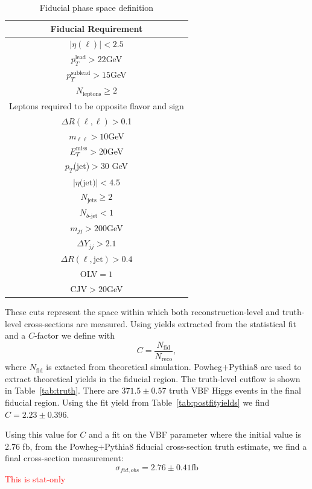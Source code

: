 \begin{table}[!ht]
\centering
\begin{tabular}{|c|}
\hline
Fiducial Requirement \\
\hline
$|\eta(\ell)|<2.5$ \\
$p_T^{\text{lead}}>22$GeV \\
$p_T^{\text{sublead}}>15$GeV \\
$N_{\text{leptons}}\geq2$ \\
Leptons required to be opposite flavor and sign \\
$\Delta R(\ell,\ell) >$0.1 \\
$m_{\ell\ell}>10$GeV \\
$E_T^{\text{miss}}>$20GeV \\
$p_T$(jet)$>$30 GeV \\
$|\eta\text{(jet)}|<4.5$ \\ 
$N_{\text{jets}} \geq 2$ \\
$N_{b\text{-jet}} < 1$ \\
$m_{jj} >200$GeV \\
$\Delta Y_{jj}>2.1$ \\
$\Delta R(\ell,\text{jet})>0.4$ \\
OLV$=1$ \\
CJV$>20$GeV \\
\hline
\end{tabular}
\caption{Fiducial phase space definition}
\label{tab:fiducial}
\end{table}
These cuts represent the space within which both reconstruction-level and truth-level cross-sections are measured. Using yields extracted from the statistical fit and a $C$-factor we define with 
\begin{equation}
C = \frac{N_\text{fid}}{N_{\text{reco}}},
\end{equation}
where $N_\text{fid}$ is extacted from theoretical simulation. Powheg$+$Pythia8 are used to extract theoretical yields in the fiducial region. The truth-level cutflow is shown in Table~\ref{tab:truth}. There are $371.5\pm0.57$ truth VBF Higgs events in the final fiducial region. Using the fit yield from Table~\ref{tab:postfityields} we find $C=2.23\pm 0.396$. 

Using this value for $C$ and a fit on the VBF parameter where the initial value is 2.76 fb, from the Powheg$+$Pythia8 fiducial cross-section truth estimate, we find a final cross-section measurement:
\begin{equation}
\sigma_{fid,obs} = 2.76 \pm 0.41 \text{fb} 
\end{equation}
\textcolor{red}{This is stat-only}

